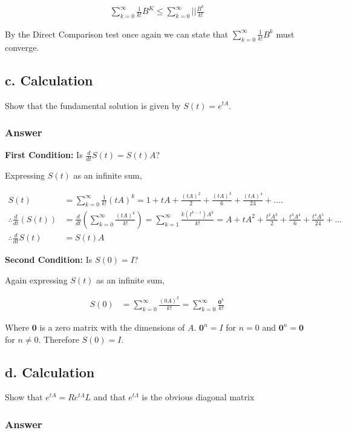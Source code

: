 \documentclass{article}
\newcommand{\n}{\newline}
\begin{document}
		\begin{align*}
			\sum_{k=0}^{\infty}\frac{1}{k!}B^{K}\leq\sum_{k=0}^{\infty}||\frac{B^k}{k!}
		\end{align*}
		
		By the Direct Comparison test once again we can state that $\sum_{k=0}^{\infty}\frac{1}{k!}B^{k}$ must converge.
		
		\subsection{c. Calculation}
		Show that the fundamental solution is given by $S(t)=e^{tA}$.
		\subsubsection{Answer}
		
		\textbf{First Condition:} Is $\frac{d}{dt}S(t)=S(t)A$?\n
		
		Expressing $S(t)$ as an infinite sum,
		
		\begin{align*}
			S(t)&=\sum_{k=0}^{\infty}\frac{1}{k!}(tA)^{k}=1+tA+\frac{(tA)^2}{2}+\frac{(tA)^3}{6}+\frac{(tA)^4}{24}+.... \\
			\therefore \frac{d}{dt}(S(t))&=\frac{d}{dt}(\sum_{k=0}^{\infty}\frac{(tA)^{k}}{k!})=\sum_{k=1}^{\infty}\frac{k(t^{k-1})A^k}{k!}=A+tA^2+\frac{t^2A^3}{2}+\frac{t^3A^4}{6}+\frac{t^4A^5}{24}+...\\
			\therefore \frac{d}{dt}S(t)&=S(t)A
		\end{align*}
		
		\textbf{Second Condition:} Is $S(0)=I$?\n
		
		Again expressing $S(t)$ as an infinite sum,
		
		\begin{align*}
			S(0)&=\sum_{k=0}^{\infty}\frac{(0A)^k}{k!}=\sum_{k=0}^{\infty}\frac{\mathbf{0}^k}{k!}
		\end{align*}
		
		Where $\mathbf{0}$ is a zero matrix with the dimensions of $A$.  $\mathbf{0}^n=I$ for $n=0$ and $\mathbf{0}^n=\mathbf{0}$ for $n\neq0$.  Therefore $S(0)=I$.
		
		
		\subsection{d. Calculation}
		Show that $e^{tA}=Re^{t\Lambda}L$ and that $e^{t\Lambda}$ is the obvious diagonal matrix
		\subsubsection{Answer}
		
\end{document}
